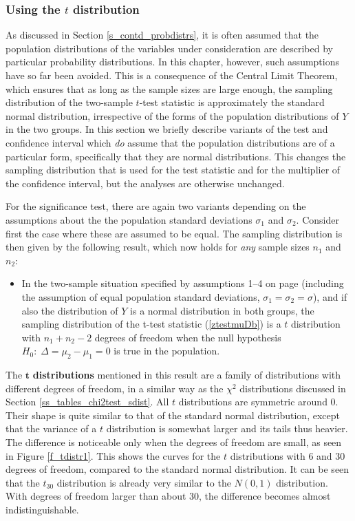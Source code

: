 \subsubsection{Using the $t$ distribution}

As discussed in Section \ref{s_contd_probdistrs}, it is often assumed
that the population distributions of the variables under consideration
are described by particular probability distributions. In this chapter,
however, such assumptions have so far been avoided. This is a
consequence of the Central Limit Theorem, which ensures that as long as
the sample sizes are large enough, the sampling distribution of the
two-sample $t$-test statistic is approximately the standard normal
distribution, irrespective of the forms of the population distributions
of $Y$ in the two groups. In this section we briefly describe variants
of the test and confidence interval which \emph{do} assume that the
population distributions are of a particular form, specifically that
they are normal distributions. This changes the sampling distribution
that is used for the test statistic and for the multiplier of the
confidence interval, but the analyses are otherwise unchanged.

For the significance test, there are again two variants depending on the assumptions about the the population standard
deviations $\sigma_{1}$ and $\sigma_{2}$. Consider first the case
where these are assumed to be
equal. The sampling distribution is then given by the following result,
which now holds for \emph{any} sample sizes $n_{1}$ and $n_{2}$:
\begin{itemize}
\item
In the two-sample situation specified by assumptions 1--4 on page
\pageref{p_2sample} (including the assumption of
equal population standard deviations,
$\sigma_{1}=\sigma_{2}=\sigma$), and if also the distribution of $Y$ is
a normal distribution in both groups, the sampling distribution of the
t-test statistic (\ref{ztestmuDb}) is a $t$ distribution with
$n_{1}+n_{2}-2$ degrees of freedom when the null hypothesis $H_{0}: \;
\Delta=\mu_{2}-\mu_{1}=0$ is true in the population.
\end{itemize}
The $\mathbf{t}$ \textbf{distributions} mentioned in this result are a
family of distributions with different degrees of freedom, in a similar
way as the $\chi^{2}$ distributions discussed in Section
\ref{ss_tables_chi2test_sdist}. All $t$
distributions are symmetric around 0.
Their
shape is quite similar to that of the standard normal distribution,
except that the variance of
a $t$ distribution is somewhat larger and its tails thus heavier.
The difference is noticeable only
when the degrees of freedom are small, as seen in Figure
\ref{f_tdistr1}. This shows the curves for the $t$ distributions with 6
and 30 degrees of freedom, compared to the standard normal distribution.
It can be seen that the $t_{30}$ distribution is already very similar to
the $N(0,1)$ distribution. With degrees of freedom larger than about 30,
the difference becomes almost indistinguishable.

